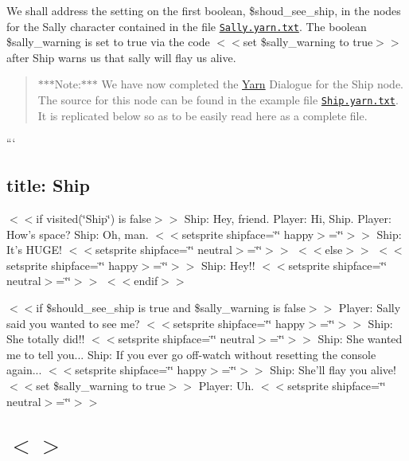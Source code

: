 We shall address the setting on the first boolean, {\ttfamily \$shoud\-\_\-see\-\_\-ship}, in the nodes for the Sally character contained in the file \href{../../Unity/Assets/YarnSpinner/Examples/DemoAssets/Space/Sally.yarn.txt}{\tt Sally.\-yarn.\-txt}. The boolean {\ttfamily \$sally\-\_\-warning} is set to {\ttfamily true} via the code {\ttfamily $<$$<$set \$sally\-\_\-warning to true$>$$>$} after Ship warns us that sally will flay us alive. \begin{quotation}
$\ast$$\ast$$\ast$\-Note\-:$\ast$$\ast$$\ast$ We have now completed the \hyperlink{a00045}{Yarn} Dialogue for the Ship node. The source for this node can be found in the example file \href{../../Unity/Assets/YarnSpinner/Examples/DemoAssets/Space/Ship.yarn.txt}{\tt Ship.\-yarn.\-txt}. It is replicated below so as to be easily read here as a complete file.

\end{quotation}
``` \subsection*{title\-: Ship }

$<$$<$if visited(\char`\"{}\-Ship\char`\"{}) is false$>$$>$ Ship\-: Hey, friend. Player\-: Hi, Ship. Player\-: How's space? Ship\-: Oh, man. $<$$<$setsprite shipface=\char`\"{}\char`\"{} happy$>$=\char`\"{}\char`\"{}$>$$>$ Ship\-: It's H\-U\-G\-E! $<$$<$setsprite shipface=\char`\"{}\char`\"{} neutral$>$=\char`\"{}\char`\"{}$>$$>$ $<$$<$else$>$$>$ $<$$<$setsprite shipface=\char`\"{}\char`\"{} happy$>$=\char`\"{}\char`\"{}$>$$>$ Ship\-: Hey!! $<$$<$setsprite shipface=\char`\"{}\char`\"{} neutral$>$=\char`\"{}\char`\"{}$>$$>$ $<$$<$endif$>$$>$

$<$$<$if \$should\-\_\-see\-\_\-ship is true and \$sally\-\_\-warning is false$>$$>$ Player\-: Sally said you wanted to see me? $<$$<$setsprite shipface=\char`\"{}\char`\"{} happy$>$=\char`\"{}\char`\"{}$>$$>$ Ship\-: She totally did!! $<$$<$setsprite shipface=\char`\"{}\char`\"{} neutral$>$=\char`\"{}\char`\"{}$>$$>$ Ship\-: She wanted me to tell you... Ship\-: If you ever go off-\/watch without resetting the console again... $<$$<$setsprite shipface=\char`\"{}\char`\"{} happy$>$=\char`\"{}\char`\"{}$>$$>$ Ship\-: She'll flay you alive! $<$$<$set \$sally\-\_\-warning to true$>$$>$ Player\-: Uh. $<$$<$setsprite shipface=\char`\"{}\char`\"{} neutral$>$=\char`\"{}\char`\"{}$>$$>$ \section*{$<$$>$ }


